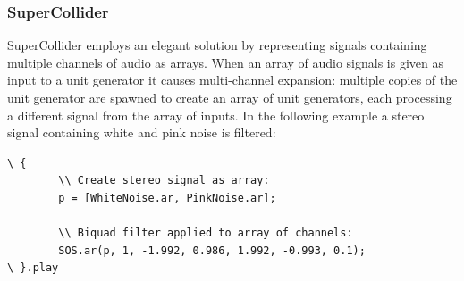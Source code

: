 \documentclass[twoside,a4paper]{article}
\begin{document}

\subsubsection{SuperCollider} %

SuperCollider employs an elegant solution by representing signals containing multiple channels of audio as arrays. 
When an array of audio signals is given as input to a unit generator it causes multi-channel expansion: multiple copies of the unit generator are spawned to create an array of unit generators, each processing a different signal from the array of inputs.
In the following example a stereo signal containing white and pink noise is filtered:

\begin{lstlisting}
\ {
		\\ Create stereo signal as array:
		p = [WhiteNoise.ar, PinkNoise.ar];
		
		\\ Biquad filter applied to array of channels:
		SOS.ar(p, 1, -1.992, 0.986, 1.992, -0.993, 0.1);
\ }.play
\end{lstlisting}

\end{document}
